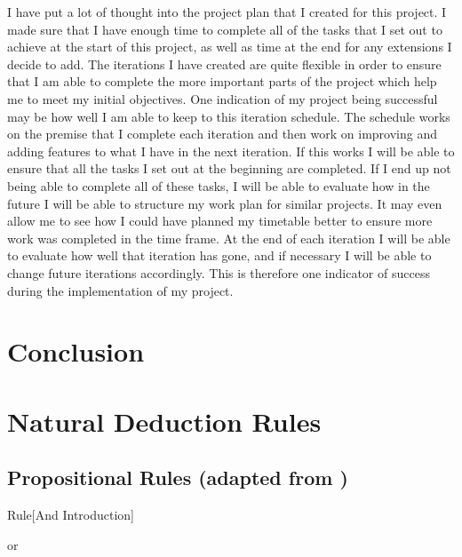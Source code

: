 I have put a lot of thought into the project plan that I created for this project. I made sure that I have enough time to complete all of the tasks that I set out to achieve at the start of this project, as well as time at the end for any extensions I decide to add. The iterations I have created are quite flexible in order to ensure that I am able to complete the more important parts of the project which help me to meet my initial objectives. One indication of my project being successful  may be how well I am able to keep to this iteration schedule. The schedule works on the premise that I complete each iteration and then work on improving and adding features to what I have in the next iteration. If this works I will be able to ensure that all the tasks I set out at the beginning are completed. If I end up not being able to complete all of these tasks, I will be able to evaluate how in the future I will be able to structure my work plan for similar projects. It may even allow me to see how I could have planned my timetable better to ensure more work was completed in the time frame. At the end of each iteration I will be able to evaluate how well that iteration has gone, and if necessary I will be able to change future iterations accordingly. This is therefore one indicator of success during the implementation of my project.
\pagebreak

\section{Conclusion}

\appendix
\section{Natural Deduction Rules}
\label{appendix:nd}

\subsection{Propositional Rules (adapted from \cite{ndBook})}
\label{appendix:nd-prop}

\begin{namedthm}{Rule}[And Introduction]

\begin{bprooftree}
\end{bprooftree}\qquad or \qquad
\begin{bprooftree}
\end{bprooftree}

\end{namedthm}

